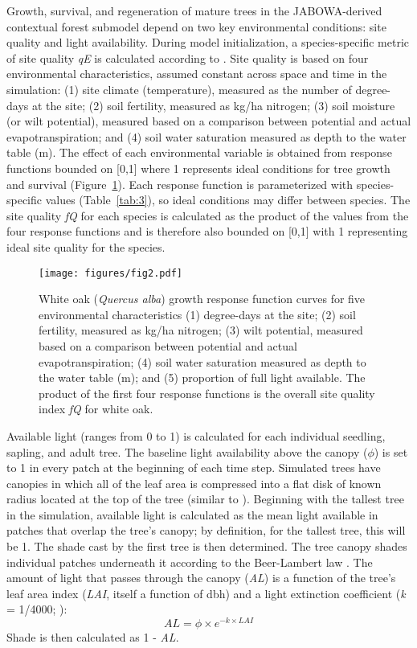 \documentclass[
11pt, %
a4paper, %
oneside, %
headinclude,footinclude, %
]{scrartcl}
\begin{document}
Growth, survival, and regeneration of mature trees in the JABOWA-derived contextual forest submodel depend on two key environmental conditions: site quality and light availability. During model initialization, a species-specific metric of site quality \textit{qE} is calculated according to \citep{Botkin1993}. Site quality is based on four environmental characteristics, assumed constant across space and time in the simulation: (1) site climate (temperature), measured as the number of degree-days at the site; (2) soil fertility, measured as kg/ha nitrogen; (3) soil moisture (or wilt potential), measured based on a comparison between potential and actual evapotranspiration; and (4) soil water saturation measured as depth to the water table (m). The effect of each environmental variable is obtained from response functions bounded on [0,1] where 1 represents ideal conditions for tree growth and survival (Figure~\ref{fig:2}). Each response function is parameterized with species-specific values (Table~\ref{tab:3}), so ideal conditions may differ between species. The site quality \textit{fQ} for each species is calculated as the product of the values from the four response functions and is therefore also bounded on [0,1] with 1 representing ideal site quality for the species.

\begin{figure}
	\centering
	\texttt{[image: figures/fig2.pdf]}
	\caption{White oak (\textit{Quercus alba}) growth response function curves for five environmental characteristics (1) degree-days at the site; (2) soil fertility, measured as kg/ha nitrogen; (3) wilt potential, measured based on a comparison between potential and actual evapotranspiration; (4) soil water saturation measured as depth to the water table (m); and (5) proportion of full light available. The product of the first four response functions is the overall site quality index \textit{fQ} for white oak.}
	\label{fig:2}
\end{figure}



Available light (ranges from 0 to 1) is calculated for each individual seedling, sapling, and adult tree. The baseline light availability above the canopy ($\phi$) is set to 1 in every patch at the beginning of each time step. Simulated trees have canopies in which all of the leaf area is compressed into a flat disk of known radius located at the top of the tree (similar to \citep{Botkin1993}). Beginning with the tallest tree in the simulation, available light is calculated as the mean light available in patches that overlap the tree’s canopy; by definition, for the tallest tree, this will be 1. The shade cast by the first tree is then determined. The tree canopy shades individual patches underneath it according to the Beer-Lambert law \citep{Nowak1996}. The amount of light that passes through the canopy (\textit{AL}) is a function of the tree’s leaf area index (\textit{LAI}, itself a function of dbh) and a light extinction coefficient (\textit{k} = 1/4000; \citep{Botkin1993}):
\begin{equation}\label{eq:light}
AL = \phi \times e^{-k \times LAI}
\end{equation}
Shade is then calculated as 1 - \textit{AL}.
\end{document}
